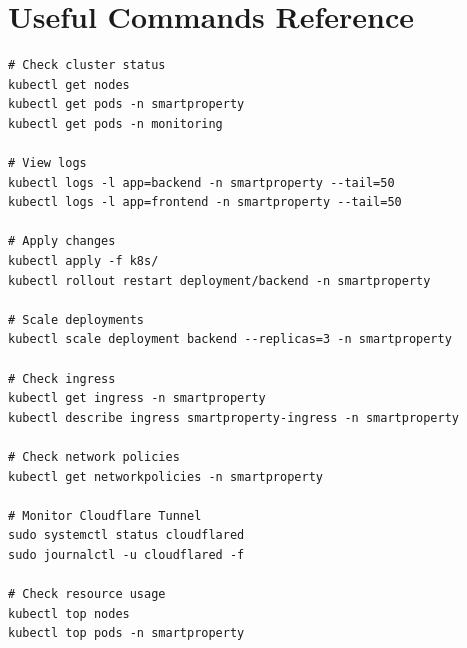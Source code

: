 \documentclass[12pt,a4paper]{report}
\begin{document}
\chapter{Useful Commands Reference}

\begin{lstlisting}[style=bashstyle, caption={Daily Operations Commands}]
# Check cluster status
kubectl get nodes
kubectl get pods -n smartproperty
kubectl get pods -n monitoring

# View logs
kubectl logs -l app=backend -n smartproperty --tail=50
kubectl logs -l app=frontend -n smartproperty --tail=50

# Apply changes
kubectl apply -f k8s/
kubectl rollout restart deployment/backend -n smartproperty

# Scale deployments
kubectl scale deployment backend --replicas=3 -n smartproperty

# Check ingress
kubectl get ingress -n smartproperty
kubectl describe ingress smartproperty-ingress -n smartproperty

# Check network policies
kubectl get networkpolicies -n smartproperty

# Monitor Cloudflare Tunnel
sudo systemctl status cloudflared
sudo journalctl -u cloudflared -f

# Check resource usage
kubectl top nodes
kubectl top pods -n smartproperty
\end{lstlisting}
\end{document}
